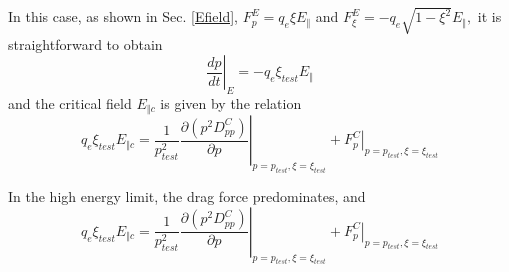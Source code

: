 In this case, as shown in Sec. \ref{Efield}, $F_{p}^{E}=q_{e}\xi E_{\Vert }$
and $F_{\xi }^{E}=-q_{e}\sqrt{1-\xi ^{2}}E_{\Vert },$ it is straightforward
to obtain 
\begin{equation}
\left. \frac{dp}{dt}\right\vert _{E}=-q_{e}\xi _{test}E_{\Vert }
\end{equation}%
and the critical field $E_{\Vert c}$ is given by the relation%
\begin{equation}
q_{e}\xi _{test}E_{\Vert c}=\frac{1}{p_{test}^{2}}\left. \frac{\partial
\left( p^{2}D_{pp}^{C}\right) }{\partial p}\right\vert _{p=p_{test},\xi =\xi
_{test}}+\left. F_{p}^{C}\right\vert _{p=p_{test},\xi =\xi _{test}}
\end{equation}

In the high energy limit, the drag force predominates, and 
\begin{equation*}
q_{e}\xi _{test}E_{\Vert c}=\frac{1}{p_{test}^{2}}\left. \frac{\partial
\left( p^{2}D_{pp}^{C}\right) }{\partial p}\right\vert _{p=p_{test},\xi =\xi
_{test}}+\left. F_{p}^{C}\right\vert _{p=p_{test},\xi =\xi _{test}}
\end{equation*}
